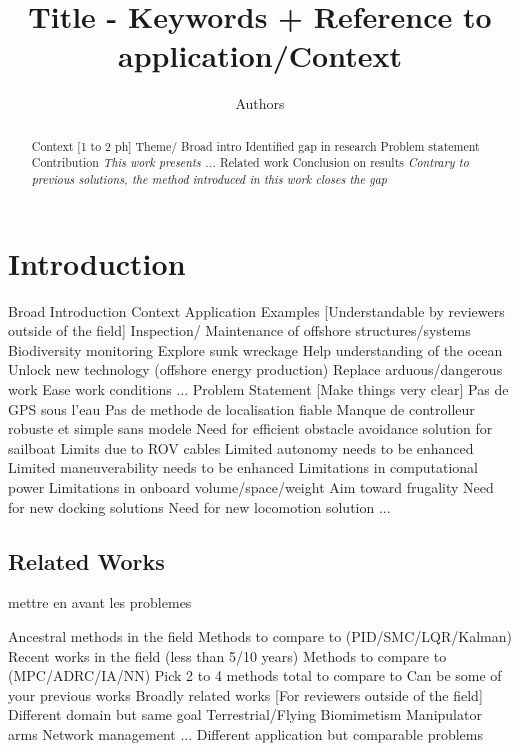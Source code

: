 \documentclass[twocolumn]{article}
\title{Title - Keywords + Reference to application/Context}
\author{Authors}
\begin{document}
\maketitle

\begin{abstract}
\begin{outline}
    \1 Context [1 to 2 ph]
    \2 Theme/ Broad intro
    \2 Identified gap in research
    \2 Problem statement
    \1 Contribution
    \2 \emph{This work presents ...}
    \1 Related work
    \1 Conclusion on results \emph{Contrary to previous solutions, the method introduced in this work closes the gap}
\end{outline}

\end{abstract}

\section{Introduction}
\begin{outline}
\1 Broad Introduction
\1 Context
\1 Application Examples [Understandable by reviewers outside of the field]
\2 Inspection/ Maintenance of offshore structures/systems
\2 Biodiversity monitoring
\2 Explore sunk wreckage
\2 Help understanding of the ocean
\2 Unlock new technology (offshore energy production)
\2 Replace arduous/dangerous work
\2 Ease work conditions
\2 ...
\1 Problem Statement [Make things very clear]
\2 Pas de GPS sous l'eau
\2 Pas de methode de localisation fiable
\2 Manque de controlleur robuste et simple sans modele
\2 Need for efficient obstacle avoidance solution for sailboat
\2 Limits due to ROV cables
\2 Limited autonomy needs to be enhanced
\2 Limited maneuverability needs to be enhanced
\2 Limitations in computational power
\2 Limitations in onboard volume/space/weight
\2 Aim toward frugality
\2 Need for new docking solutions
\2 Need for new locomotion solution
\2 ...
\end{outline}

\subsection{Related Works}
mettre en avant les problemes
\begin{outline}
\1 Ancestral methods in the field
\2 Methods to compare to (PID/SMC/LQR/Kalman)
\1 Recent works in the field (less than 5/10 years)
\2 Methods to compare to (MPC/ADRC/IA/NN)
\2 Pick 2 to 4 methods total to compare to
\2 Can be some of your previous works
\1 Broadly related works [For reviewers outside of the field]
\2 Different domain but same goal
\3 Terrestrial/Flying
\3 Biomimetism
\3 Manipulator arms
\3 Network management
\3 ...
\2 Different application but comparable problems
\end{outline}
\end{document}
